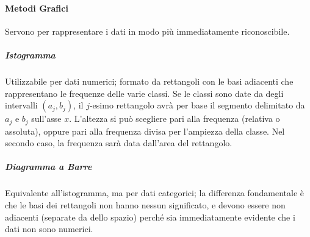 \documentclass{article}
\theoremstyle{plain}
\theoremstyle{definition}
\theoremstyle{remark}
\begin{document}
\paragraph{Metodi Grafici} %
\label{par:metodi_grafici}
Servono per rappresentare i dati in modo più immediatamente riconoscibile.
\subparagraph{Istogramma} %
\label{subp:istogramma}
Utilizzabile per dati numerici; formato da rettangoli con le basi adiacenti che rappresentano le frequenze delle varie classi. Se le classi sono date da degli intervalli $(a_j,b_j)$, il $j$-esimo rettangolo avrà per base il segmento delimitato da $a_j$ e $b_j$ sull'asse $x$. L'altezza si può scegliere pari alla frequenza (relativa o assoluta), oppure pari alla frequenza divisa per l'ampiezza della classe. Nel secondo caso, la frequenza sarà data dall'area del rettangolo.
\subparagraph{Diagramma a Barre} %
\label{subp:diagramma_a_barre}
Equivalente all'istogramma, ma per dati categorici; la differenza fondamentale è che le basi dei rettangoli non hanno nessun significato, e devono essere non adiacenti (separate da dello spazio) perché sia immediatamente evidente che i dati non sono numerici.
\end{document}
